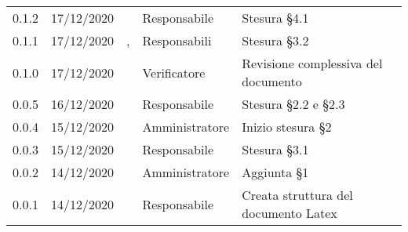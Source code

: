 {\begin{longtable}{C{2cm} C{2.5cm} C{3cm} C{2.5cm} C{5cm}}
0.1.2 & 17/12/2020 & \SG{} & Responsabile & Stesura \S 4.1 \\

0.1.1 & 17/12/2020 & \SG{},\newline \BM{} & Responsabili & Stesura \S 3.2 \\

0.1.0 & 17/12/2020 & \ZM{} & Verificatore & Revisione complessiva del documento \\

0.0.5 & 16/12/2020 & \BM{} & Responsabile & Stesura \S 2.2 e \S 2.3 \\
		
0.0.4 & 15/12/2020 & \PA{} & Amministratore & Inizio stesura \S 2 \\

0.0.3 & 15/12/2020 & \SG{} & Responsabile & Stesura \S 3.1 \\

0.0.2 & 14/12/2020 & \PA{} & Amministratore & Aggiunta \S 1 \\

0.0.1 & 14/12/2020 & \SG{} & Responsabile & Creata struttura del documento Latex \\
		
\end{longtable}
}
